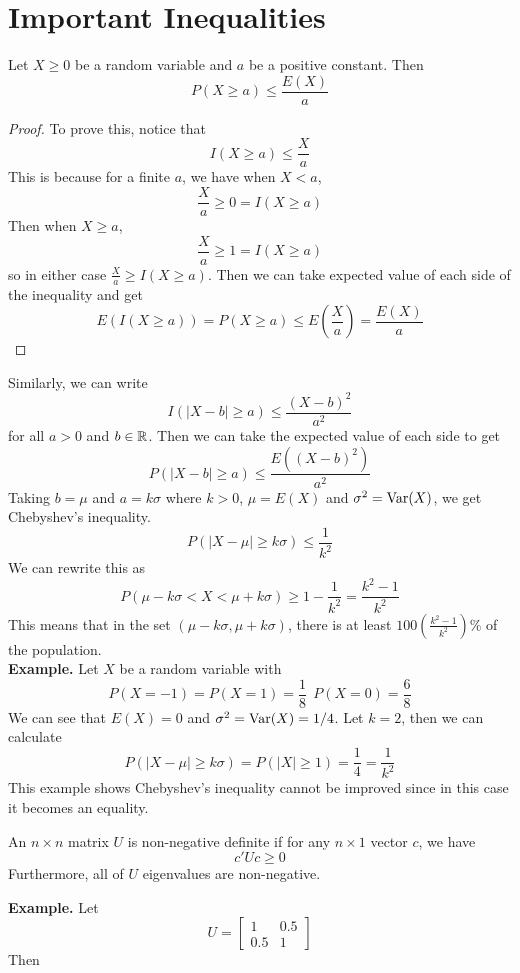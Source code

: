 \section{Important Inequalities}
\begin{theorem}
    Let $X \geq 0$ be a random variable and $a$ be a positive constant. Then 
    \[P(X \geq a) \leq \frac{E(X)}{a}\]
\end{theorem}
\begin{proof}
    To prove this, notice that 
    \[I(X \geq a) \leq \frac{X}{a}\]
    This is because for a finite $a$, we have when $X < a$,
    \[\frac{X}{a} \geq 0 = I(X \geq a)\]
    Then when $X \geq a$,
    \[\frac{X}{a} \geq 1 = I(X \geq a)\]
    so in either case $\frac{X}{a} \geq I(X \geq a)$. Then we can take expected value of each side of the inequality and get 
    \[E(I(X \geq a)) = P(X \geq a) \leq E\left(\frac{X}{a}\right) = \frac{E(X)}{a} \] 
\end{proof}
Similarly, we can write 
\[I(|X-b|\geq a) \leq \frac{(X-b)^2}{a^2}\]
for all $a > 0$ and $b \in \mathbb{R}$. Then we can take the expected value of each side to get
\[P(|X-b| \geq a) \leq \frac{E((X-b)^2)}{a^2}\]
Taking $b = \mu$ and $a = k\sigma$ where $k > 0$, $\mu = E(X)$ and $\sigma^2 = \operatorname{Var}(X)$, we get Chebyshev's inequality.
\[P(|X - \mu| \geq k\sigma) \leq \frac{1}{k^2} \]
We can rewrite this as 
\[P(\mu - k\sigma < X < \mu + k\sigma) \geq 1 - \frac{1}{k^2} = \frac{k^2-1}{k^2}\]
This means that in the set $(\mu - k\sigma, \mu +k\sigma)$, there is at least $100\left(\frac{k^2-1}{k^2}\right)\%$ of the population.\\[2ex]
\textbf{Example.} Let $X$ be a random variable with
\[P(X = -1) = P(X = 1) = \frac{1}{8} \ \ P(X = 0) = \frac{6}{8}\]
We can see that $E(X) = 0$ and $\sigma^2 = \operatorname{Var}(X) = 1/4$. Let $k = 2$, then we can calculate
\[P(|X - \mu| \geq k\sigma) = P(|X| \geq 1) = \frac{1}{4}= \frac{1}{k^2}\]
This example shows Chebyshev's inequality cannot be improved since in this case it becomes an equality.
\begin{definition}
    An $n \times n$ matrix $U$ is non-negative definite if for any $n \times 1$ vector $c$, we have
    \[c'Uc \geq 0\]
    Furthermore, all of $U$ eigenvalues are non-negative.
\end{definition}
\noindent
\textbf{Example.}
Let 
\[U = \begin{bmatrix}
    1 & 0.5 \\
    0.5 & 1
\end{bmatrix}\]
Then 
